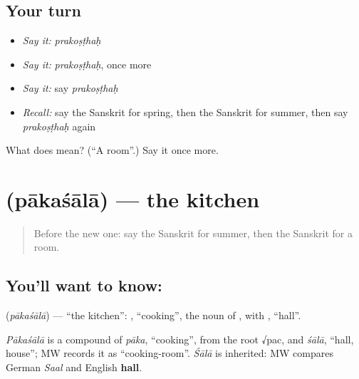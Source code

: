 \subsection*{Your turn}
\begin{itemize}
\raggedright
  \item \emph{Say it:} \emph{prakoṣṭhaḥ}
  \item \emph{Say it:} \emph{prakoṣṭhaḥ}, once more
  \item \emph{Say it:} say \emph{prakoṣṭhaḥ}
  \item \emph{Recall:} say the Sanskrit for spring, then the Sanskrit for summer, then say \emph{prakoṣṭhaḥ} again
\end{itemize}

\begin{tcolorbox}[breakable,colback=teal!4,colframe=teal!35!black,title={Before you move on}]
What does  mean? (\textquotedblleft{}A room\textquotedblright{}.) Say it once more.
\end{tcolorbox}
\section[\texorpdfstring{\sk{पाकशाला} (pākaśālā)}{पाकशाला (pākaśālā)}]{ (pākaśālā) — the kitchen}

\label{lesson:SA-C77-kitchen}



\begin{quote}
Before the new one: say the Sanskrit for summer, then the Sanskrit for a room.
\end{quote}

\subsection*{You'll want to know: }
\textbf{} (\emph{pākaśālā}) — \textquotedblleft{}the kitchen\textquotedblright{}: \textbf{}, \textquotedblleft{}cooking\textquotedblright{}, the noun of \textbf{}, with \textbf{}, \textquotedblleft{}hall\textquotedblright{}.

\begin{cousinweb}
\emph{Pākaśālā} is a compound of \emph{pāka}, \textquotedblleft{}cooking\textquotedblright{}, from the root √pac, and \emph{śālā}, \textquotedblleft{}hall, house\textquotedblright{}; MW records it as \textquotedblleft{}cooking-room\textquotedblright{}. \emph{Śālā} is inherited: MW compares German \emph{Saal} and English \textbf{hall}.
\end{cousinweb}

